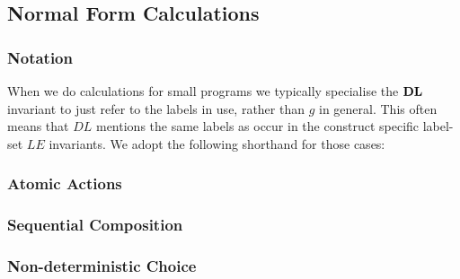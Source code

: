 \subsection{Normal Form Calculations}\label{ssec:nf-calc}

\subsubsection{Notation}

When we do calculations for small programs
we typically specialise the $\mathbf{DL}$ invariant to just refer
to the labels in use, rather than $g$ in general.
This often means that $DL$ mentions the same labels as occur
in the construct specific label-set $LE$ invariants.
We adopt the following shorthand for those cases:

\subsubsection{Atomic Actions}


\subsubsection{Sequential Composition}




\subsubsection{Non-deterministic Choice}



